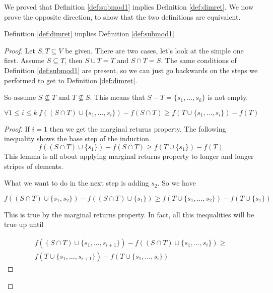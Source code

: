 We proved that Definition \ref{def:submod1} implies Definition \ref{def:dimret}. We now prove the opposite direction, to show that the two definitions are equivalent.

\begin{claim}\label{marg_ret_impl_sm}
	Definition \ref{def:dimret} implies Definition \ref{def:submod1}
\end{claim}
\begin{proof}
Let $S, T \subseteq V$ be given. There are two cases, let's look at the simple one first. Assume $S \subseteq T$, then $S \cup T = T$ and $S\cap T = S$. The same conditions of Definition \ref{def:submod1} are present, so we can just go backwards on the steps we performed to get to Definition \ref{def:dimret}.


So assume $S \not\subseteq T$ and $T \not\subseteq S$. This means that $S - T =\{s_1,\ldots, s_k\}$ is not empty.
\begin{lem}
\begin{equation}
\forall 1 \leq i \leq k\ f((S \cap T) \cup \{s_1,\ldots, s_i\}) - f(S\cap T) \geq f(T \cup \{s_1,\ldots, s_i\}) - f(T)
\end{equation}
\end{lem}
\begin{proof}
If $i=1$ then we get the marginal returns property. The following inequality shows the base step of the induction.
\begin{equation}
f((S \cap T) \cup \{s_1\}) - f(S\cap T) \geq f(T \cup \{s_1\}) -f(T)
\end{equation}
This lemma is all about applying marginal returns property to longer and longer stripes of elements.

What we want to do in the next step is adding $s_2$. So we have

\begin{equation}
f((S \cap T) \cup \{s_1, s_2\}) - f((S\cap T) \cup \{s_1\} ) \geq f(T \cup \{s_1,\ldots, s_2\}) -f(T \cup \{s_1\})
\end{equation}

This is true by the marginal returns property. In fact, all this inequalities will be true up until

\begin{multline}
f((S \cap T) \cup \{s_1, \ldots, s_{i+1}\}) - f((S\cap T) \cup\{s_1, \ldots, s_i\} ) \geq \\ f(T \cup \{s_1, \ldots, s_{i+1}\}) -f(T \cup \{s_1,\ldots, s_i\})
\end{multline}


\end{proof}
\end{proof}
